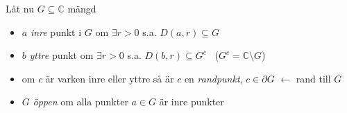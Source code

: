 Låt nu $G \subseteq \mathbb{C}$ mängd

\begin{itemize}
  \item $a$ \emph{inre} punkt i $G$ om $\exists r > 0$ s.a. $D(a, r) \subseteq G$
  \item $b$ \emph{yttre} punkt om $\exists r > 0$ s.a. $D(b, r) \subseteq G^c$ \ ($G^c = \mathbb{C} \setminus G$)
  \item om $c$ är varken inre eller yttre så är $c$ en \emph{randpunkt},
    $c \in \partial G$ \textcolor{blue!60!black}{$\leftarrow$ rand till $G$}
  \item $G$ \emph{öppen} om alla punkter $a \in G$ är inre punkter
\end{itemize}
